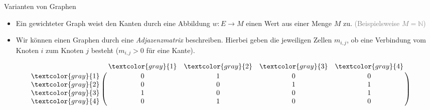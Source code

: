 \begin{frame}{Varianten von Graphen}
    \begin{itemize}[<+(1)->]
        \widei
        \item Ein gewichteter Graph weist den Kanten durch eine Abbildung \(w: E \to M\) einen Wert aus einer Menge \(M\) zu. \textcolor{gray}{(Beispielsweise \(M = \mathbb{N}\))}
        \item Wir können einen Graphen durch eine \emph{Adjazenzmatrix} beschreiben.\pause{} Hierbei geben die jeweiligen Zellen \(m_{i,j}\), ob eine Verbindung vom Knoten \(i\) zum Knoten \(j\) besteht (\(m_{i, j} > 0\) für eine Kante).
    \end{itemize}
    \vfill\pause{}
    \begin{minipage}{.45\linewidth}
\centering{}
    \end{minipage}\quad\begin{minipage}{.45\linewidth}%
        \[\bordermatrix{~ & \textcolor{gray}{1} & \textcolor{gray}{2} & \textcolor{gray}{3} & \textcolor{gray}{4} \cr
        \textcolor{gray}{1} & 0 & 1 & 0 & 0\cr
        \textcolor{gray}{2} & 0 & 0 & 1 & 1\cr
        \textcolor{gray}{3} & 1 & 0 & 0 & 1\cr
        \textcolor{gray}{4} & 0 & 1 & 0 & 0\cr
        }\]
    \end{minipage}
\end{frame}

